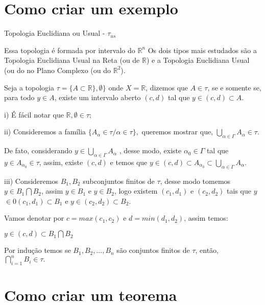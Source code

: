 \section{Como criar um exemplo}

\begin{ex}{Topologia Euclidiana ou Usual} - $\tau_{us}$

Essa topologia é formada por intervalo do $\mathbb{R}^{n}$
Os dois tipos mais estudados são a Topologia Euclidiana Usual na Reta (ou  de $\mathbb{R}$) e a Topologia Euclidiana Usual (ou do  no Plano Complexo (ou do $\mathbb{R}^{2}$).

Seja a topologia $\tau = \{A \subset \mathbb{R}\}, \emptyset\}$ onde $X = \mathbb{R}$, dizemos que $A \in \tau$, se e somente se, para todo $y \in A$, existe um intervalo aberto $(c,d)$ tal que
$y \in (c,d) \subset A.$

\item i) É fácil notar que $\mathbb{R}, \emptyset \in \tau;$

\item ii) Consideremos a família $\{A_{\alpha} \in \tau / \alpha \in\tau\},$
queremos mostrar que, $\bigcup\limits_{\alpha\in \Gamma} A_{\alpha}\in \tau.$

De fato, considerando $y \in \bigcup\limits_{\alpha\in \Gamma} A_{\alpha}$ ,
desse modo, existe $\alpha_{0} \in \Gamma$ tal que $y \in A_{\alpha_{0}} \in \tau$, assim, existe $(c,d)$ e
temos que $y\in (c,d) \subset A_{\alpha_{0}}\subset \bigcup\limits_{\alpha\in \Gamma}A_{\alpha}.$

\item iii) Consideremos $B_{1},B_{2}$ subconjuntos finitos de $\tau$, desse modo
tomemos $y \in B_{1}\bigcap B_{2}$, assim $y\in B_{1}$ e $y\in B_{2}$,
logo existem $(c_{1}, d_{1})$ e $(c_{2}, d_{2})$ tais que $y$
$\in0 (c_{1}, d_{1}) \subset B_{1}$ e $y\in (c_{2}, d_{2}) \subset B_{2}.$

Vamos denotar por $c = max(c_{1},c_{2})$ e $d = min(d_{1},d_{2})$, assim temos:

\begin{center}
 $y \in (c,d) \subset B_{1} \bigcap B_{2}$
\end{center}
 
Por indução temos  se $B_{1},B_{2},..., B_{n}$ são conjuntos finitos de $\tau$, então, $\bigcap\limits_{i=1}^{n}B_{i}\in\tau.$
\end{ex}

\section{Como criar um teorema}

